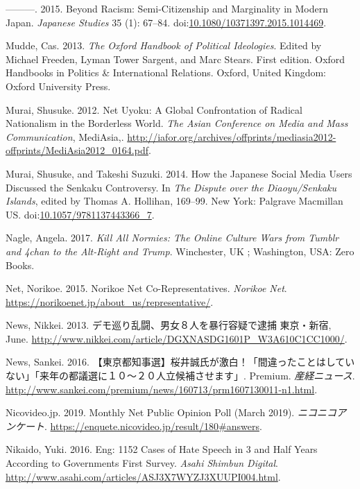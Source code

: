 \documentclass[10pt,british,A4paper,,openany]{memoir}
\begin{document}
\hypertarget{ref-morris-suzuki_beyond_2015}{}
---------. 2015. Beyond Racism: Semi-Citizenship and Marginality in
Modern Japan. \emph{Japanese Studies} 35 (1): 67--84.
doi:\href{https://doi.org/10.1080/10371397.2015.1014469}{10.1080/10371397.2015.1014469}.

\hypertarget{ref-mudde_oxford_2013}{}
Mudde, Cas. 2013. \emph{The Oxford Handbook of Political Ideologies}.
Edited by Michael Freeden, Lyman Tower Sargent, and Marc Stears. First
edition. Oxford Handbooks in Politics \& International Relations.
Oxford, United Kingdom: Oxford University Press.

\hypertarget{ref-murai_net_2012}{}
Murai, Shusuke. 2012. Net Uyoku: A Global Confrontation of Radical
Nationalism in the Borderless World. \emph{The Asian Conference on Media
and Mass Communication}, MediAsia,.
\url{http://iafor.org/archives/offprints/mediasia2012-offprints/MediAsia2012_0164.pdf}.

\hypertarget{ref-hollihan_how_2014}{}
Murai, Shusuke, and Takeshi Suzuki. 2014. How the Japanese Social Media
Users Discussed the Senkaku Controversy. In \emph{The Dispute over the
Diaoyu/Senkaku Islands}, edited by Thomas A. Hollihan, 169--99. New
York: Palgrave Macmillan US.
doi:\href{https://doi.org/10.1057/9781137443366_7}{10.1057/9781137443366\_7}.

\hypertarget{ref-nagle_kill_2017}{}
Nagle, Angela. 2017. \emph{Kill All Normies: The Online Culture Wars
from Tumblr and 4chan to the Alt-Right and Trump}. Winchester, UK ;
Washington, USA: Zero Books.

\hypertarget{ref-net_norikoe_2015}{}
Net, Norikoe. 2015. Norikoe Net Co-Representatives. \emph{Norikoe Net}.
\url{https://norikoenet.jp/about_us/representative/}.

\hypertarget{ref-nikkei_news__2013}{}
News, Nikkei. 2013. デモ巡り乱闘、男女８人を暴行容疑で逮捕 東京・新宿,
June. \url{http://www.nikkei.com/article/DGXNASDG1601P_W3A610C1CC1000/}.

\hypertarget{ref-sankei_news__2016}{}
News, Sankei. 2016.
【東京都知事選】桜井誠氏が激白！「間違ったことはしていない」「来年の都議選に１０～２０人立候補させます」.
Premium. \emph{産経ニュース}.
\url{http://www.sankei.com/premium/news/160713/prm1607130011-n1.html}.

\hypertarget{ref-nicovideo.jp_monthly_2019}{}
Nicovideo.jp. 2019. Monthly Net Public Opinion Poll (March 2019).
\emph{ニコニコアンケート}.
\url{https://enquete.nicovideo.jp/result/180\#answers}.

\hypertarget{ref-nikaido_eng:_2016}{}
Nikaido, Yuki. 2016. Eng: 1152 Cases of Hate Speech in 3 and Half Years
According to Governments First Survey. \emph{Asahi Shimbun Digital}.
\url{http://www.asahi.com/articles/ASJ3X7WYZJ3XUUPI004.html}.
\end{document}
